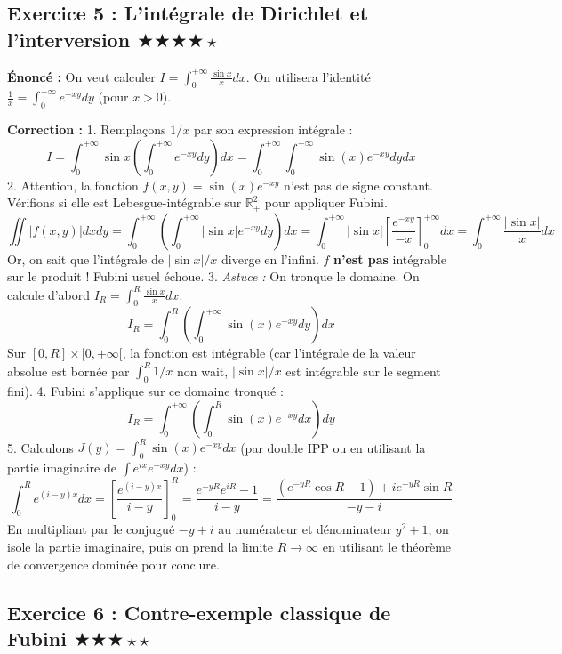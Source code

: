 \documentclass[11pt,a4paper]{article}
\begin{document}
\subsection*{Exercice 5 : L'intégrale de Dirichlet et l'interversion \quad $\bigstar\bigstar\bigstar\bigstar\star$}

\textbf{Énoncé :}
On veut calculer $I = \int_0^{+\infty} \frac{\sin x}{x} dx$. On utilisera l'identité $\frac{1}{x} = \int_0^{+\infty} e^{-xy} dy$ (pour $x > 0$).

\textbf{Correction :}
1. Remplaçons $1/x$ par son expression intégrale :
   $$ I = \int_0^{+\infty} \sin x \left( \int_0^{+\infty} e^{-xy} dy \right) dx = \int_0^{+\infty} \int_0^{+\infty} \sin(x) e^{-xy} dy dx $$
2. Attention, la fonction $f(x, y) = \sin(x) e^{-xy}$ n'est pas de signe constant. Vérifions si elle est Lebesgue-intégrable sur $\mathbb{R}_+^2$ pour appliquer Fubini.
   $$ \iint |f(x,y)| dx dy = \int_0^{+\infty} \left( \int_0^{+\infty} |\sin x| e^{-xy} dy \right) dx = \int_0^{+\infty} |\sin x| \left[ \frac{e^{-xy}}{-x} \right]_0^{+\infty} dx = \int_0^{+\infty} \frac{|\sin x|}{x} dx $$
   Or, on sait que l'intégrale de $|\sin x|/x$ diverge en l'infini. $f$ \textbf{n'est pas} intégrable sur le produit ! Fubini usuel échoue.
3. \textit{Astuce :} On tronque le domaine. On calcule d'abord $I_R = \int_0^R \frac{\sin x}{x} dx$.
   $$ I_R = \int_0^R \left( \int_0^{+\infty} \sin(x) e^{-xy} dy \right) dx $$
   Sur $[0, R] \times [0, +\infty[$, la fonction est intégrable (car l'intégrale de la valeur absolue est bornée par $\int_0^R 1/x$ non wait, $|\sin x|/x$ est intégrable sur le segment fini).
4. Fubini s'applique sur ce domaine tronqué :
   $$ I_R = \int_0^{+\infty} \left( \int_0^R \sin(x) e^{-xy} dx \right) dy $$
5. Calculons $J(y) = \int_0^R \sin(x) e^{-xy} dx$ (par double IPP ou en utilisant la partie imaginaire de $\int e^{ix} e^{-xy} dx$) :
   $$ \int_0^R e^{(i-y)x} dx = \left[ \frac{e^{(i-y)x}}{i-y} \right]_0^R = \frac{e^{-yR}e^{iR} - 1}{i-y} = \frac{(e^{-yR}\cos R - 1) + i e^{-yR}\sin R}{-y - i} $$
   En multipliant par le conjugué $-y+i$ au numérateur et dénominateur $y^2+1$, on isole la partie imaginaire, puis on prend la limite $R \to \infty$ en utilisant le théorème de convergence dominée pour conclure.


\subsection*{Exercice 6 : Contre-exemple classique de Fubini \quad $\bigstar\bigstar\bigstar\star\star$}
\end{document}
